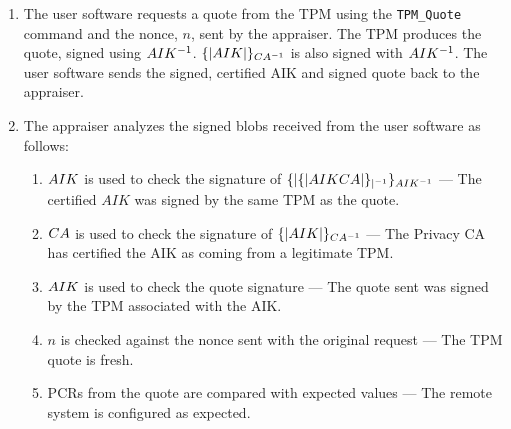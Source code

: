 \documentclass[10pt]{article}
\begin{document}
\begin{enumerate}
\item The user software requests a quote from the TPM using the
  \verb+TPM_Quote+ command and the nonce, $n$, sent by the appraiser.
  The TPM produces the quote, signed using $AIK^{-1}$.
  $\{|AIK|\}_{CA^{-1}}$ is also signed with $AIK^{-1}$.  The
  user software sends the signed, certified AIK and signed quote back
  to the appraiser.

\item The appraiser analyzes the signed blobs received from the user
  software as follows: 
  
  \begin{enumerate}
  \item $AIK$ is used to check the signature of
    $\{|\{|AIK{CA}|\}_{|^{-1}}\}_{AIK^{-1}}$ --- The certified $AIK$ was
    signed by the same TPM as the quote.
    
  \item $CA$ is used to check the signature of
    $\{|AIK|\}_{CA^{-1}}$ --- The Privacy CA has certified the AIK
    as coming from a legitimate TPM.
  
  \item $AIK$ is used to check the quote signature --- The
    quote sent was signed by the TPM associated with the AIK.
    
  \item $n$ is checked against the nonce sent with the original
    request --- The TPM quote is fresh.
    
  \item PCRs from the quote are compared with expected values --- The
    remote system is configured as expected.
  \end{enumerate}
\end{enumerate}
\end{document}
